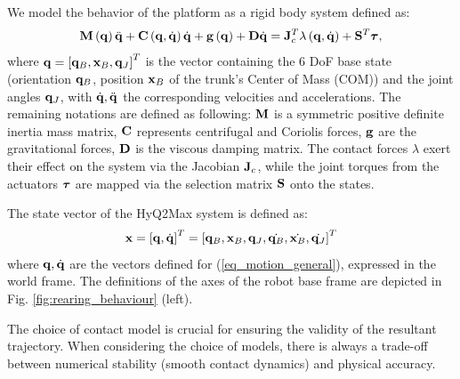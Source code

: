 \documentclass[usletter, 10pt, conference]{ieeeconf}      %
\begin{document}
We model the behavior of the platform as a rigid body system defined as:
\begin{equation}
\mathbf{M} \left( \mathbf{q} \right) \ddot{\mathbf{q}} + \mathbf{C} \left( \mathbf{q}, \dot{\mathbf{q}} \right) \dot{\mathbf{q}}+ 
\mathbf{g} \left( \mathbf{q} \right) + \mathbf{D} \dot{\mathbf{q}} = \mathbf{J}^T_{c} \lambda \left( \mathbf{q}, 
\dot{\mathbf{q}} \right) + \mathbf{S}^{T} \boldsymbol{\tau},
\label{eq_motion_general}
\end{equation}
\noindent 
where $\mathbf{q} = \left[\mathbf{q}_{B}, \mathbf{x}_{B}, \mathbf{q}_{J} \right]^{T} $ is the vector containing 
the 6 DoF base state (orientation $\mathbf{q}_{B}$, position $\mathbf{x}_{B}$ of the trunk's Center of Mass (COM)) and the 
joint angles $\mathbf{q}_{J}$,  with $\dot{\mathbf{q}}, \ddot{\mathbf{q}}$ the corresponding 
velocities and accelerations. The remaining notations are defined as following:
$ \mathbf{M} $ is a symmetric positive definite inertia mass 
matrix, $ \mathbf{C}$ represents centrifugal and Coriolis forces, $ \mathbf{g}$ are the 
gravitational forces, $\mathbf{D}$ is the viscous damping matrix. The contact forces 
$\lambda$ exert their effect on the system via the Jacobian $\mathbf{J}_{c}$, while the 
joint torques from the actuators $ \boldsymbol{\tau} $ are mapped via the selection matrix 
$\mathbf{S}$ onto the states.

The state vector of the HyQ2Max system is defined as:
\begin{equation}
 \mathbf{x} = \left[  \mathbf{q} ,   \dot{\mathbf{q}} \right] ^{T} =
 \left[ \mathbf{q}_{B}, \mathbf{x}_{B}, \mathbf{q}_{J}, \dot{\mathbf{q}_{B}}, 
\dot{\mathbf{x}_{B}}, \dot{\mathbf{q}_{J}} \right] ^{T}
 \label{eq_state}
\end{equation}
\noindent 
where $ \mathbf{q} , \dot{\mathbf{q}}$ are the vectors defined 
for (\ref{eq_motion_general}), expressed in the world frame. The definitions of the
axes of the robot base frame are depicted in Fig. \ref{fig:rearing_behaviour} (left).


The choice of contact model is crucial for ensuring the validity of the 
resultant trajectory. When considering the choice of models, there is always a
trade-off between numerical stability (smooth contact dynamics) and physical 
accuracy. 
\end{document}
